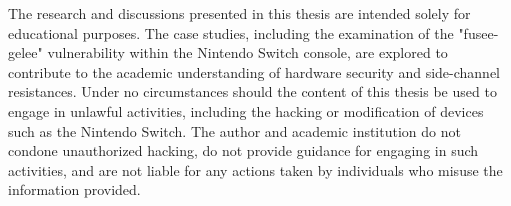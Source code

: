 \beforeabstract
{}


The research and discussions presented in this thesis are intended solely for educational purposes. The case studies, including the examination of the "fusee-gelee" vulnerability within the Nintendo Switch console, are explored to contribute to the academic understanding of hardware security and side-channel resistances. Under no circumstances should the content of this thesis be used to engage in unlawful activities, including the hacking or modification of devices such as the Nintendo Switch. The author and academic institution do not condone unauthorized hacking, do not provide guidance for engaging in such activities, and are not liable for any actions taken by individuals who misuse the information provided.

\afterpreface\afterabstract
